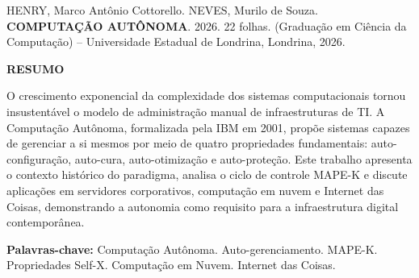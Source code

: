 \noindent HENRY, Marco Antônio Cottorello. NEVES, Murilo de Souza.
\textbf{COMPUTAÇÃO AUTÔNOMA}. 2026.
22 folhas.
(Graduação em Ciência da Computação) -- Universidade Estadual de Londrina,
Londrina, 2026.

\vspace{2\baselineskip}

\begin{center}
  \textbf{RESUMO}
\end{center}

\vspace{\baselineskip}

\noindent O crescimento exponencial da complexidade dos sistemas computacionais tornou insustentável o modelo de administração manual de infraestruturas de TI. A Computação Autônoma, formalizada pela IBM em 2001, propõe sistemas capazes de gerenciar a si mesmos por meio de quatro propriedades fundamentais: auto-configuração, auto-cura, auto-otimização e auto-proteção. Este trabalho apresenta o contexto histórico do paradigma, analisa o ciclo de controle MAPE-K e discute aplicações em servidores corporativos, computação em nuvem e Internet das Coisas, demonstrando a autonomia como requisito para a infraestrutura digital contemporânea.

\vfill

\noindent\textbf{Palavras-chave:} Computação Autônoma. Auto-gerenciamento. MAPE-K. Propriedades Self-X. Computação em Nuvem. Internet das Coisas.

